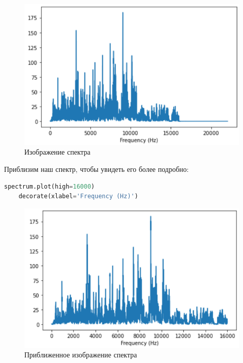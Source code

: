 \documentclass[a4paper]{article}
\begin{document}
            \begin{figure}[H]
                \centering
                \includegraphics[width=\textwidth]{spectr_ilustr.png}
                \caption{Изображение спектра}
                \label{fig:specrt_image}
            \end{figure}
            
            Приблизим наш спектр, чтобы увидеть его более подробно:

\begin{lstlisting}[language=Python, caption= Приближенное изображение спектра]
    spectrum.plot(high=16000)
    decorate(xlabel='Frequency (Hz)')
\end{lstlisting}
            
            \begin{figure}[H]
                \centering
                \includegraphics[width=\textwidth]{spectr_ilustr_add.png}
                \caption{Приближенное изображение спектра}
                \label{fig:spectr_image_add}
            \end{figure}
            
\end{document}
